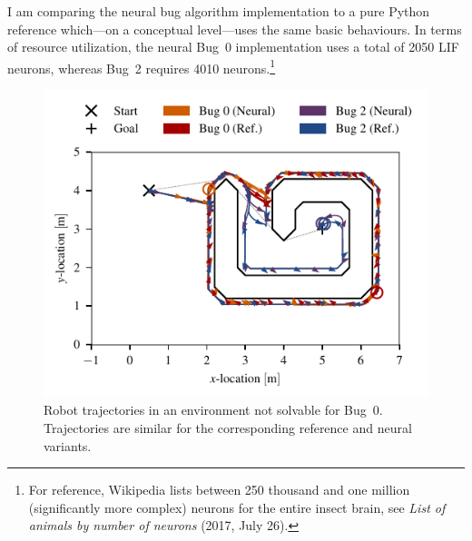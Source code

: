 \documentclass[letterpaper,10pt,conference]{ieeeconf}
\begin{document}
I am comparing the neural bug algorithm implementation to a pure Python reference which---on a conceptual level---uses the same basic behaviours. In terms of resource utilization, the neural Bug~0 implementation uses a total of 2050 LIF neurons, whereas Bug~2 requires 4010 neurons.\footnote{For reference, Wikipedia lists between 250 thousand and one million (significantly more complex) neurons for the entire insect brain, see \emph{List of animals by number of neurons} (2017, July 26).}

\begin{figure}
	\centering
	\includegraphics{media/vis_traj_map_demo_03_bug_0_neural_bug_0_ref_bug_2_neural_bug_2_ref.pdf}
	\caption{Robot trajectories in an environment not solvable for Bug~0. Trajectories are similar for the corresponding reference and neural variants.}
	\label{fig:experiment_1_trajectory}
\end{figure}
\end{document}
